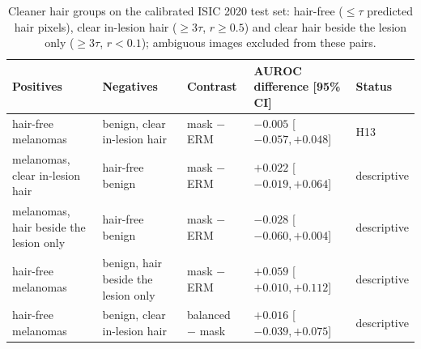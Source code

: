 \begin{table}[H]\centering\scriptsize
\caption{Cleaner hair groups on the calibrated ISIC 2020 test set: hair-free ($\le\tau$ predicted hair pixels), clear in-lesion hair ($\ge3\tau$, $r\ge0.5$) and clear hair beside the lesion only ($\ge3\tau$, $r<0.1$); ambiguous images excluded from these pairs.}\label{tab:s16r13}
\begin{tabular}{p{3.4cm}p{3.4cm}p{2.0cm}p{3.4cm}p{1.6cm}}\toprule
Positives & Negatives & Contrast & AUROC difference [95\% CI] & Status \\\midrule
hair-free melanomas & benign, clear in-lesion hair & mask $-$ ERM & $-0.005$ [$-0.057, +0.048$] & H13 \\
melanomas, clear in-lesion hair & hair-free benign & mask $-$ ERM & $+0.022$ [$-0.019, +0.064$] & descriptive \\
melanomas, hair beside the lesion only & hair-free benign & mask $-$ ERM & $-0.028$ [$-0.060, +0.004$] & descriptive \\
hair-free melanomas & benign, hair beside the lesion only & mask $-$ ERM & $+0.059$ [$+0.010, +0.112$] & descriptive \\
hair-free melanomas & benign, clear in-lesion hair & balanced $-$ mask & $+0.016$ [$-0.039, +0.075$] & descriptive \\
\bottomrule\end{tabular}
\end{table}

